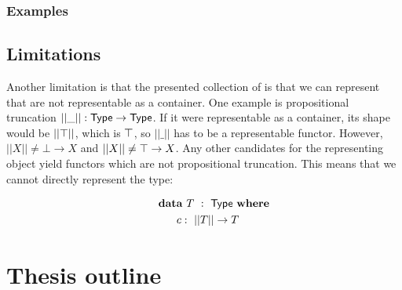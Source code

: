 \documentclass[a4paper,10pt]{report}
\begin{document}

\subsection{Examples}


\section{Limitations}


Another limitation is that the presented collection of \onehits is
that we can represent \hits that are not representable as a
container. One example is propositional truncation
$|| \_ || : \mathsf{Type} \to \mathsf{Type}$. If it were representable as a container,
its shape would be $|| \top ||$, which is $\top$, so $|| \_ ||$
has to be a representable functor. However, $|| X || \neq \bot \to X$
and $|| X || \neq \top \to X$. Any other candidates for the
representing object yield functors which are not propositional
truncation. This means that we cannot directly represent the type:

\begin{alignat*}{2}
  &\rlap{$\data\ T\ :\ \Type\ \where$} \\
  &&\ \ c     &:\ || T || \to T
\end{alignat*}



\chapter{Thesis outline}
\label{sec:outline}
\end{document}
